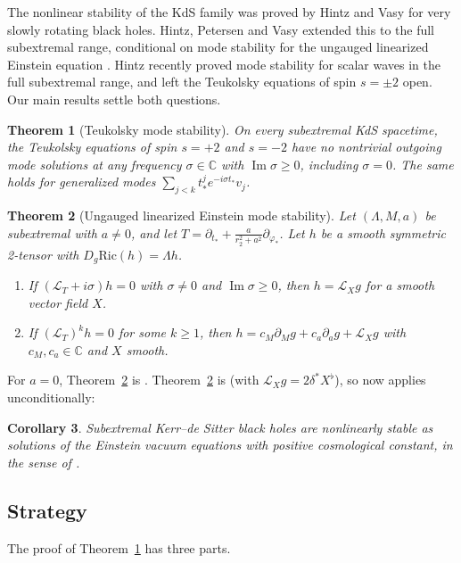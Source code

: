 \documentclass[11pt]{amsart}
\newtheorem{theorem}{Theorem}[section]
\newtheorem{corollary}[theorem]{Corollary}
\theoremstyle{definition}
\theoremstyle{remark}
\numberwithin{equation}{section}
\newcommand{\cL}{\mathcal{L}}
\newcommand{\C}{\mathbb{C}}
\renewcommand{\Im}{\operatorname{Im}}
\begin{document}
The nonlinear stability of the KdS family was proved by Hintz and Vasy \cite{HV18} for very slowly rotating black
holes. Hintz, Petersen and Vasy \cite{HPV25} extended this to the full subextremal range, conditional on mode
stability for the ungauged linearized Einstein equation \cite[Assumption~1.2]{HPV25}. Hintz \cite{Hin26} recently
proved mode stability for scalar waves in the full subextremal range, and left the Teukolsky equations of spin
$s=\pm2$ open. Our main results settle both questions.

\begin{theorem}[Teukolsky mode stability]\label{thm:A}
On every subextremal KdS spacetime, the Teukolsky equations of spin $s=+2$ and $s=-2$ have no nontrivial outgoing
mode solutions at any frequency $\sigma\in\C$ with $\Im\sigma\ge0$, including $\sigma=0$. The same holds for
generalized modes $\sum_{j<k}t_*^je^{-i\sigma t_*}v_j$.
\end{theorem}

\begin{theorem}[Ungauged linearized Einstein mode stability]\label{thm:B}
Let $(\Lambda,M,a)$ be subextremal with $a\neq0$, and let $T=\partial_{t_*}+\frac{a}{r_2^2+a^2}\partial_{\varphi_*}$.
Let $h$ be a smooth symmetric 2-tensor with $D_g\mathrm{Ric}(h)=\Lambda h$.
\begin{enumerate}[label=(\arabic*)]
\item If $(\cL_T+i\sigma)h=0$ with $\sigma\ne0$ and $\Im\sigma\ge0$, then $h=\cL_Xg$ for a smooth vector field $X$.
\item If $(\cL_T)^kh=0$ for some $k\ge1$, then $h=c_M\partial_Mg+c_a\partial_ag+\cL_Xg$ with $c_M,c_a\in\C$ and $X$
smooth.
\end{enumerate}
\end{theorem}

For $a=0$, Theorem~\ref{thm:B} is \cite[\S7]{HV18}. Theorem~\ref{thm:B} is \cite[Assumption~1.2]{HPV25} (with $\cL_Xg=2\delta^*X^\flat$),
so \cite[Theorem~1.4]{HPV25} now applies unconditionally:

\begin{corollary}
Subextremal Kerr--de Sitter black holes are nonlinearly stable as solutions of the Einstein vacuum equations with
positive cosmological constant, in the sense of \cite[Theorem~1.4]{HPV25}.
\end{corollary}

\subsection{Strategy}
The proof of Theorem~\ref{thm:A} has three parts.
\end{document}
